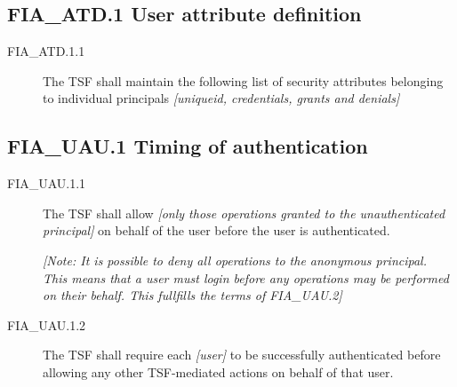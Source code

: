 \documentclass[12pt,english]{scrbook}
\begin{document}



\subsection{FIA{\_}ATD.1 User attribute definition}
\begin{description}
\item[FIA{\_}ATD.1.1 ]

The TSF shall maintain the following list of security attributes
belonging to individual principals \emph{{[}uniqueid, credentials, grants
and denials]}

\end{description}





\subsection{FIA{\_}UAU.1 Timing of authentication}
\begin{description}
\item[FIA{\_}UAU.1.1 ]

The TSF shall allow \emph{{[}only those operations granted to the
unauthenticated principal]} on behalf of the user before the user is
authenticated.

\emph{{[}Note: It is possible to deny all operations to the anonymous
principal. This means that a user must login before any operations may
be performed on their behalf. This fullfills the terms of FIA{\_}UAU.2]}

\item[FIA{\_}UAU.1.2 ]

The TSF shall require each \emph{{[}user]} to be successfully
authenticated before allowing any other TSF-mediated actions on behalf
of that user.

\end{description}


\end{document}
